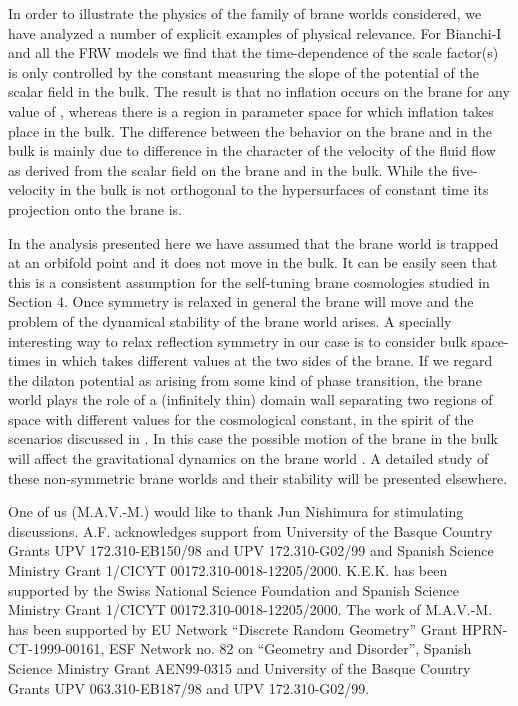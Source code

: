 \documentclass[prd,a4paper,twocolumn,superscriptaddress,nofootinbib,showpacs]{revtex4}
\begin{document}
In order to illustrate the physics of the family of brane worlds considered, we have analyzed a 
number of explicit examples of physical relevance. For Bianchi-I and all the FRW models we find
that the time-dependence of the scale factor(s) is only controlled by the constant \coordHE{} measuring the 
slope of the potential of the scalar field in the bulk. The result is that no inflation occurs 
on the brane for any value of \coordHE{}, whereas there is a region in parameter space for which
inflation takes place in the bulk. The difference between the behavior on the brane and in the
bulk is mainly due to difference in the character of the velocity of the fluid flow as 
derived from the scalar field on the brane and in the bulk. While the
five-velocity in the bulk is not orthogonal to the hypersurfaces of constant time 
its projection onto the brane is.

In the analysis presented here we have assumed that the brane world is trapped at an orbifold point and it does not 
move in the bulk. It can be easily seen that this is a consistent assumption for the self-tuning brane cosmologies
studied in Section 4. Once \coordHE{} symmetry is relaxed in general the brane will move and
the problem of the dynamical stability of the brane world arises. A specially interesting way
to relax reflection symmetry in our case is to consider bulk space-times in which \myHighlight{$\xi$}\coordHE{} takes different
values at the two sides of the brane. If we regard the dilaton potential as arising from some 
kind of phase transition, the brane world plays the role of a (infinitely thin) domain wall separating 
two regions of space with different values for the cosmological constant, in the spirit 
of the scenarios discussed in \cite{bu}. In this case the possible motion of the brane in the bulk 
will affect the gravitational dynamics on the brane world \cite{krauss,stw}. A detailed study
of these non-symmetric brane worlds and their stability will be presented elsewhere.


\begin{acknowledgments}

One of us (M.A.V.-M.) would like to thank Jun Nishimura for stimulating discussions.  
A.F. acknowledges support from University of the Basque Country Grants UPV 172.310-EB150/98 and
UPV 172.310-G02/99 and Spanish Science Ministry Grant 1/CICYT 00172.310-0018-12205/2000. K.E.K. 
has been supported by the Swiss National Science Foundation and Spanish Science Ministry Grant 
1/CICYT 00172.310-0018-12205/2000. The work of M.A.V.-M. has been
supported by EU Network ``Discrete Random Geometry'' Grant HPRN-CT-1999-00161, ESF Network no. 82
on ``Geometry and Disorder'', Spanish Science Ministry Grant AEN99-0315 and 
University of the Basque Country Grants UPV 063.310-EB187/98 and UPV 172.310-G02/99.

\end{acknowledgments}
\end{document}
